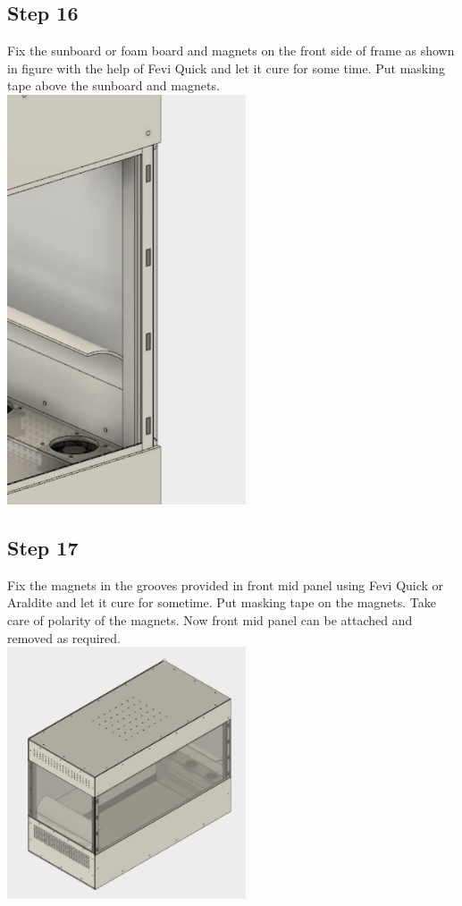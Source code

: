\documentclass[a4paper,12pt,oneside]{book}
\begin{document}
\subsection*{Step 16}
Fix the sunboard or foam board and magnets on the front side of frame as shown in figure with the help of Fevi Quick and let it cure for some time. Put masking tape above the sunboard and magnets.\\
\includegraphics[width=200pt]{16}
\subsection*{Step 17}
Fix the magnets in the grooves provided in front mid panel using Fevi Quick or Araldite and let it cure for sometime. Put masking tape on the magnets. Take care of polarity of the magnets. Now front mid panel can be attached and removed as required.\\
\includegraphics[width=200pt]{17}
\end{document}
